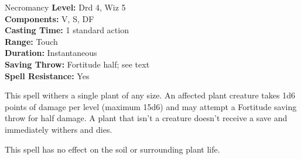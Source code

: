 {Necromancy}
{
	\textbf{Level:}
	Drd 4, Wiz 5\\
	\textbf{Components:}
	V, S, DF\\
	\textbf{Casting Time:}
	1 standard action\\
	\textbf{Range:}
	Touch\\
	\textbf{Duration:}
	Instantaneous\\
	\textbf{Saving Throw:}
	Fortitude half; see text\\
	\textbf{Spell Resistance:}
	Yes\\
}
{
	This spell withers a single plant of any size. An affected plant creature takes 1d6 points of damage per level (maximum 15d6) and may attempt a Fortitude saving throw for half damage. A plant that isn't a creature doesn't receive a save and immediately withers and dies.

	This spell has no effect on the soil or surrounding plant life.

}
